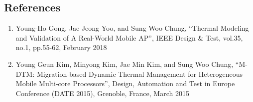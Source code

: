 \subsection{References}
\begin{enumerate}
    \item Young-Ho Gong, Jae Jeong Yoo, and Sung Woo Chung, ``Thermal Modeling and Validation of A Real-World Mobile AP'', IEEE Design \& Test, vol.35, no.1, pp.55-62, February 2018
    \item Young Geun Kim, Minyong Kim, Jae Min Kim, and Sung Woo Chung, ``M-DTM: Migration-based Dynamic Thermal Management for Heterogeneous Mobile Multi-core Processors'', Design, Automation and Test in Europe Conference (DATE 2015), Grenoble, France, March 2015
\end{enumerate}
